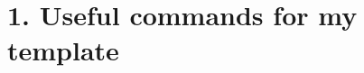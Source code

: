 \documentclass[11pt]{article}
\begin{document}
\tableofcontents
\newpage


\section*{1. Useful commands for my template}



\newpage
\printbibliography
\end{document}
